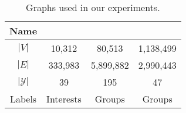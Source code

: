 \begin{table}[t!]
\begin{center}
  \begin{tabular}{ c | c | c | c }
	Name & \blogcatalog & \flickr & \youtube \\
    \hline
	$|V|$ & 10,312 & 80,513 & 1,138,499 \\
	$|E|$ & 333,983 & 5,899,882 & 2,990,443 \\
	$|\mathcal{Y}|$ & 39 & 195 & 47 \\
	Labels & Interests & Groups & Groups \\

  \end{tabular}
  \caption{Graphs used in our experiments.}
  \label{table.graph_info}  
\end{center}
\end{table}

